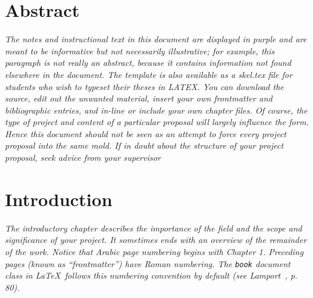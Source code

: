 \documentclass[12pt,openany,a4paper]{book}
\newcommand{\purple}[1]{\textcolor{topicpurple}{\textit{#1}}}
\begin{document}
\chapter{Abstract}


\purple{The notes and instructional text in this document are displayed in purple and are meant to be informative but not necessarily illustrative; for example, this paragraph is not really an abstract, because it contains information not found elsewhere in the document. The template is also available as a skel.tex file for students who wish to typeset their theses in LATEX. You can download the source, edit out the unwanted material, insert your own frontmatter and bibliographic entries, and in-line or include your own chapter files. Of course, the type of project and content of a particular proposal will largely influence the form. Hence this document should not be seen as an attempt to force every project proposal into the same mold. If in doubt about the structure of your project proposal, seek advice from your supervisor}

\tableofcontents

\listoffigures
{}

\listoftables
{}

% 

\cleardoublepage

\mainmatter


%
%
%
%	
%	

\chapter{Introduction}
\purple{
The introductory chapter describes the importance of the field and the
scope and significance of your project.  It sometimes ends with an
overview of the remainder of the work. Notice that Arabic page numbering begins with Chapter 1.  Preceding
pages (known as ``frontmatter'') have Roman numbering.  The
\texttt{book} document class in \LaTeX\ follows this numbering
convention by default (see Lamport~\cite{lamport}, p.\,80).   } 
\end{document}
